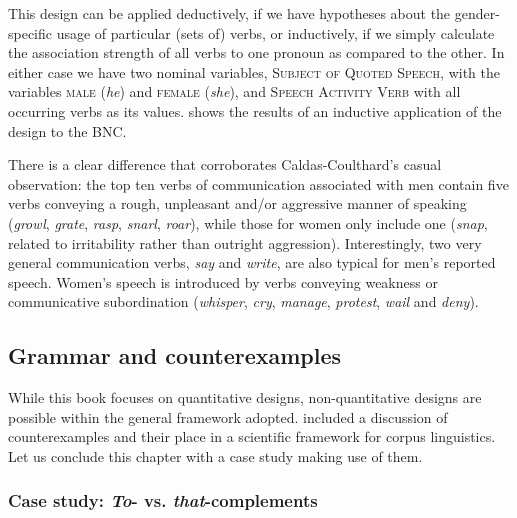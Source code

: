 This design  can be applied deductively,  if we have hypotheses about the gender\hyp{}specific  usage of particular (sets of) verbs,  or inductively,  if we simply calculate the association  strength of all verbs to one pronoun  as compared to the other. In either case we have two nominal  variables, \textsc{Subject of Quoted Speech}, with the variables \textsc{male} (\textit{he}) and \textsc{female} (\textit{she}), and \textsc{Speech Activity Verb} with all occurring verbs  as its values.  shows the results of an inductive  application of the design  to the  BNC.

There is a clear difference that corroborates Caldas\hyp{}Coulthard's casual observation: the top ten verbs  of communication associated  with men contain five verbs conveying a rough, unpleasant and\slash or aggressive manner of speaking (\textit{growl}, \textit{grate}, \textit{rasp}, \textit{snarl}, \textit{roar}), while those for women only include one (\textit{snap}, related to irritability rather than outright aggression).  Interestingly, two very general communication verbs, \textit{say} and \textit{write}, are also typical for men's reported speech. Women's speech is introduced by verbs  conveying weakness or communicative subordination (\textit{whisper}, \textit{cry}, \textit{manage}, \textit{protest}, \textit{wail} and \textit{deny}).

\subsection{Grammar and counterexamples}
\label{sec:grammarandcounterexamples}

While this book focuses on quantitative  designs,  non\hyp{}quantitative  designs are possible within the general framework adopted.  included a discussion of counterexamples  and their place in a scientific framework for corpus linguistics. Let us conclude this chapter with a case study making use of them.

\subsubsection{Case study: \textit{To}- vs. \textit{that}-complements}
\label{sec:tovsthatcomplements}

